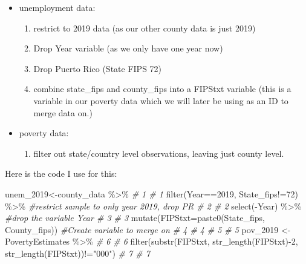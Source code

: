 \documentclass[
]{book}
\newenvironment{Shaded}{\begin{snugshade}}{\end{snugshade}}
\newcommand{\AttributeTok}[1]{\textcolor[rgb]{0.77,0.63,0.00}{#1}}
\newcommand{\CommentTok}[1]{\textcolor[rgb]{0.56,0.35,0.01}{\textit{#1}}}
\newcommand{\DecValTok}[1]{\textcolor[rgb]{0.00,0.00,0.81}{#1}}
\newcommand{\FunctionTok}[1]{\textcolor[rgb]{0.00,0.00,0.00}{#1}}
\newcommand{\NormalTok}[1]{#1}
\newcommand{\OtherTok}[1]{\textcolor[rgb]{0.56,0.35,0.01}{#1}}
\newcommand{\SpecialCharTok}[1]{\textcolor[rgb]{0.00,0.00,0.00}{#1}}
\newcommand{\StringTok}[1]{\textcolor[rgb]{0.31,0.60,0.02}{#1}}
\providecommand{\tightlist}{%
  \setlength{\itemsep}{0pt}\setlength{\parskip}{0pt}}
\begin{document}
\begin{itemize}
\tightlist
\item
  unemployment data:

  \begin{enumerate}
  \def\labelenumi{\arabic{enumi}.}
  \tightlist
  \item
    restrict to 2019 data (as our other county data is just 2019)
  \item
    Drop Year variable (as we only have one year now)
  \item
    Drop Puerto Rico (State FIPS 72)
  \item
    combine state\_fips and county\_fips into a FIPStxt variable (this is a variable in our poverty data which we will later be using as an ID to merge data on.)
  \end{enumerate}
\item
  poverty data:

  \begin{enumerate}
  \def\labelenumi{\arabic{enumi}.}
  \tightlist
  \item
    filter out state/country level observations, leaving just county level.
  \end{enumerate}
\end{itemize}

Here is the code I use for this:

\begin{Shaded}
\begin{Highlighting}[]
\NormalTok{unem\_2019}\OtherTok{\textless{}{-}}\NormalTok{county\_data }\SpecialCharTok{\%\textgreater{}\%}                                                            \CommentTok{\# 1  \# 1}
  \FunctionTok{filter}\NormalTok{(Year}\SpecialCharTok{==}\DecValTok{2019}\NormalTok{, State\_fips}\SpecialCharTok{!=}\DecValTok{72}\NormalTok{) }\SpecialCharTok{\%\textgreater{}\%} \CommentTok{\#restrict sample to only year 2019, drop PR  \# 2  \# 2}
  \FunctionTok{select}\NormalTok{(}\SpecialCharTok{{-}}\NormalTok{Year) }\SpecialCharTok{\%\textgreater{}\%} \CommentTok{\#drop the variable Year                                           \# 3  \# 3}
  \FunctionTok{mutate}\NormalTok{(}\AttributeTok{FIPStxt=}\FunctionTok{paste0}\NormalTok{(State\_fips, County\_fips)) }\CommentTok{\#Create variable to merge on        \# 4  \# 4}
                                                                                      \CommentTok{\# 5  \# 5}
\NormalTok{pov\_2019 }\OtherTok{\textless{}{-}}\NormalTok{ PovertyEstimates }\SpecialCharTok{\%\textgreater{}\%}                                                      \CommentTok{\# 6  \# 6}
  \FunctionTok{filter}\NormalTok{(}\FunctionTok{substr}\NormalTok{(FIPStxt, }\FunctionTok{str\_length}\NormalTok{(FIPStxt)}\SpecialCharTok{{-}}\DecValTok{2}\NormalTok{, }\FunctionTok{str\_length}\NormalTok{(FIPStxt))}\SpecialCharTok{!=}\StringTok{"000"}\NormalTok{)          }\CommentTok{\# 7  \# 7}
\end{Highlighting}
\end{Shaded}
\end{document}
